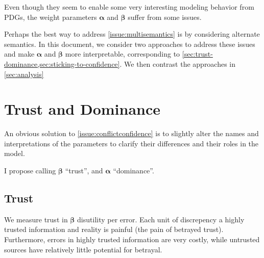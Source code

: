 \documentclass[twoside]{article} %
\theoremstyle{plain}
\theoremstyle{definition}
\newcommand{\balpha}{\boldsymbol\alpha}
\newcommand{\bbeta}{\boldsymbol\beta}
\begin{document}
    Even though they seem to enable some very interesting modeling behavior from PDGs, the weight parameters $\balpha$ and $\bbeta$ suffer from some issues.
    
    
    
    Perhaps the best way to address \cref{issue:multisemantics} is by considering alternate semantics.
    In this document, we consider two approaches to address these issues and make $\balpha$ and $\bbeta$ more interpretable, corresponding to \cref{sec:trust-dominance,sec:sticking-to-confidence}. We then contrast the approaches in \cref{sec:analysis}
    
    
    \section{Trust and Dominance}\label{sec:trust-dominance}
    An obvious solution to \cref{issue:conflictconfidence} is to slightly alter the names and interpretations of the parameters to clarify their differences and their roles in the model.
    
    I propose calling $\bbeta$ ``trust'', and $\balpha$ ``dominance''.     
    
        
    
    
    \subsection{Trust}
    We measure trust in $\bbeta$ disutility per error. 
    Each unit of discrepency a highly trusted information and reality is painful (the pain of betrayed trust).
    Furthermore, errors in highly trusted information are very costly, while untrusted sources have relatively little potential for betrayal. 
    
\end{document}
